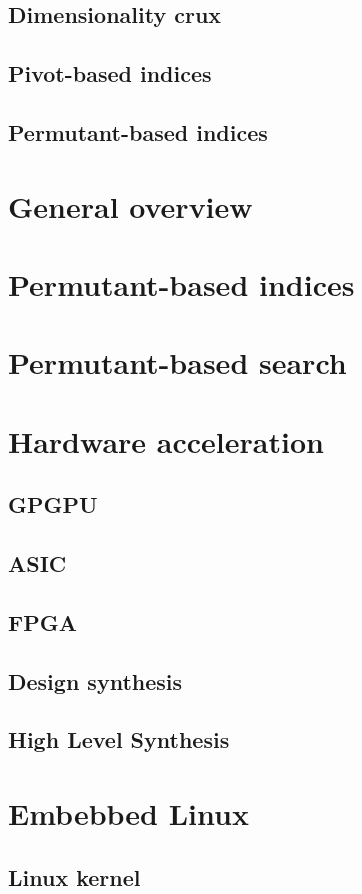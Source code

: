 \documentclass{iccmemoria}
\begin{document}
    \subsection{Dimensionality crux}
    \subsection{Pivot-based indices}
    \subsection{Permutant-based indices}
  \section{General overview}
  \section{Permutant-based indices}
  \section{Permutant-based search}
  \section{Hardware acceleration}
    \subsection{GPGPU}
    \subsection{ASIC}
    \subsection{FPGA}
    \subsection{Design synthesis}
    \subsection{High Level Synthesis}
  \section{Embebbed Linux} 
    \subsection{Linux kernel}
\end{document}

